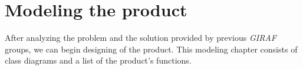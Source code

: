 \chapter{Modeling the product}
After analyzing the problem and the solution provided by previous \textit{GIRAF} groups, we can begin designing of the product.
This modeling chapter consists of class diagrams and a list of the product's functions.
